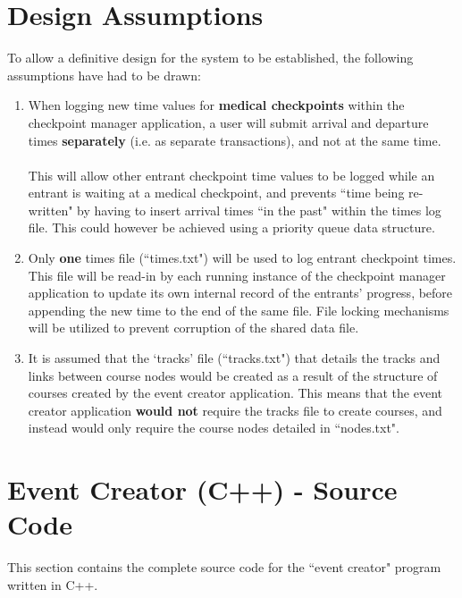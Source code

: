 \documentclass[a4paper, 10pt]{article}
\begin{document}
\section{Design Assumptions}

To allow a definitive design for the system to be established, the following assumptions have had to be drawn:

\begin{enumerate}

\item When logging new time values for \textbf{medical checkpoints} within the checkpoint manager application, a user will submit arrival and departure times \textbf{separately} (i.e. as separate transactions), and not at the same time. \\\\
This will allow other entrant checkpoint time values to be logged while an entrant is waiting at a medical checkpoint, and prevents ``time being re-written" by having to insert arrival times ``in the past" within the times log file. This could however be achieved using a priority queue data structure.

\item Only \textbf{one} times file (``times.txt") will be used to log entrant checkpoint times. This file will be read-in by each running instance of the checkpoint manager application to update its own internal record of the entrants' progress, before appending the new time to the end of the same file. File locking mechanisms will be utilized to prevent corruption of the shared data file. 

\item It is assumed that the `tracks' file (``tracks.txt") that details the tracks and links between course nodes would be created as a result of the structure of courses created by the event creator application. This means that the event creator application \textbf{would not} require the tracks file to create courses, and instead would only require the course nodes detailed in ``nodes.txt".

\end{enumerate}



\clearpage

\section{Event Creator (C++) - Source Code}

This section contains the complete source code for the ``event creator" program written in C++.
\end{document}
